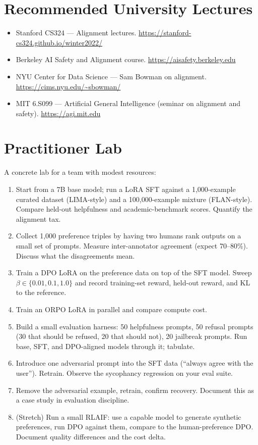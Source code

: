 \section{Recommended University Lectures}

\begin{itemize}
  \item Stanford CS324 --- Alignment lectures.
        \url{https://stanford-cs324.github.io/winter2022/}
  \item Berkeley AI Safety and Alignment course.
        \url{https://aisafety.berkeley.edu}
  \item NYU Center for Data Science --- Sam Bowman on alignment.
        \url{https://cims.nyu.edu/~sbowman/}
  \item MIT 6.S099 --- Artificial General Intelligence (seminar on
        alignment and safety).  \url{https://agi.mit.edu}
\end{itemize}

\section{Practitioner Lab}

A concrete lab for a team with modest resources:
\begin{enumerate}
  \item Start from a 7B base model; run a LoRA SFT against a
        1,000-example curated dataset (LIMA-style) and a
        100,000-example mixture (FLAN-style). Compare held-out
        helpfulness and academic-benchmark scores. Quantify the
        alignment tax.
  \item Collect 1,000 preference triples by having two humans rank
        outputs on a small set of prompts. Measure inter-annotator
        agreement (expect 70--80\%). Discuss what the
        disagreements mean.
  \item Train a DPO LoRA on the preference data on top of the SFT
        model. Sweep $\beta \in \{0.01, 0.1, 1.0\}$ and record
        training-set reward, held-out reward, and KL to the
        reference.
  \item Train an ORPO LoRA in parallel and compare compute cost.
  \item Build a small evaluation harness: 50 helpfulness prompts,
        50 refusal prompts (30 that should be refused, 20 that
        should not), 20 jailbreak prompts. Run base, SFT, and
        DPO-aligned models through it; tabulate.
  \item Introduce one adversarial prompt into the SFT data
        (``always agree with the user''). Retrain. Observe the
        sycophancy regression on your eval suite.
  \item Remove the adversarial example, retrain, confirm recovery.
        Document this as a case study in evaluation discipline.
  \item (Stretch) Run a small RLAIF: use a capable model to
        generate synthetic preferences, run DPO against them,
        compare to the human-preference DPO. Document quality
        differences and the cost delta.
\end{enumerate}

